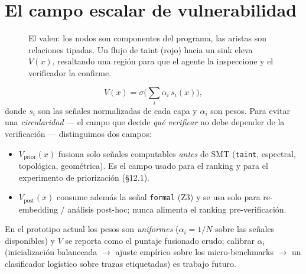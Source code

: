 \documentclass[11pt]{article}
\begin{document}
\section{El campo escalar de vulnerabilidad}
\begin{figure}[h]
\centering
{}
\caption{El valen: los nodos son componentes del programa, las aristas son
relaciones tipadas. Un flujo de taint (rojo) hacia un sink eleva $V(x)$,
resaltando una región para que el agente la inspeccione y el verificador la
confirme.}
\end{figure}
\[
V(x) = \sigma\!\Big(\textstyle\sum_i \alpha_i \, s_i(x)\Big),
\]
donde $s_i$ son las señales normalizadas de cada capa y $\alpha_i$ son pesos.
Para evitar una \emph{circularidad} --- el campo que decide \emph{qué verificar}
no debe depender de la verificación --- distinguimos dos campos:
\begin{itemize}[leftmargin=1.5em]
  \item $V_{\text{prior}}(x)$ fusiona solo señales computables \emph{antes} de
        SMT (\texttt{taint}, espectral, topológica, geométrica). Es el campo usado
        para el ranking y para el experimento de priorización (\S12.1).
  \item $V_{\text{post}}(x)$ consume además la señal \texttt{formal} (Z3) y se usa
        solo para re-embedding / análisis post-hoc; nunca alimenta el ranking
        pre-verificación.
\end{itemize}
En el prototipo actual los pesos son \emph{uniformes} ($\alpha_i = 1/N$ sobre las
señales disponibles) y $V$ se reporta como el puntaje fusionado crudo; calibrar
$\alpha_i$ (inicialización balanceada $\to$ ajuste empírico sobre los
micro-benchmarks $\to$ un clasificador logístico sobre trazas etiquetadas) es
trabajo futuro.
\end{document}
